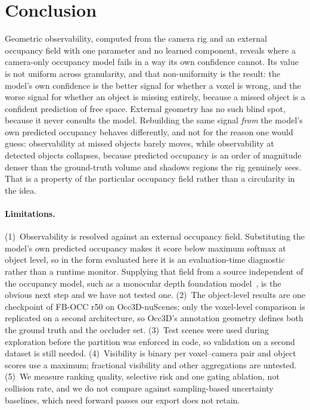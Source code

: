 \documentclass[10pt,twocolumn,letterpaper]{article}
\begin{document}
\section{Conclusion}
Geometric observability, computed from the camera rig and an external
occupancy field with one parameter and no learned component, reveals where
a camera-only occupancy model fails in a way its own confidence cannot.
Its value is not uniform across granularity, and that non-uniformity is the
result: the model's own confidence is the better signal for whether a voxel
is wrong, and the worse signal for whether an object is missing entirely,
because a missed object is a confident prediction of free space. External
geometry has no such blind spot, because it never consults the model.
Rebuilding the same signal \emph{from} the model's own predicted occupancy
behaves differently, and not for the reason one would guess: observability
at missed objects barely moves, while observability at detected objects
collapses, because predicted occupancy is an order of magnitude denser than
the ground-truth volume and shadows regions the rig genuinely sees. That is
a property of the particular occupancy field rather than a circularity in
the idea.

\paragraph{Limitations.}
(1)~Observability is resolved against an external occupancy field.
Substituting the model's own predicted occupancy makes it score below
maximum softmax at object level, so in the form evaluated here it is an
evaluation-time diagnostic rather than a runtime monitor. Supplying that
field from a source independent of the occupancy model, such as a monocular
depth foundation model~\cite{bochkovskii2024depthpro, hu2024metric3dv2}, is
the obvious next step and we have not tested one.
(2)~The object-level results are one checkpoint of FB-OCC r50 on
Occ3D-nuScenes; only the voxel-level comparison is replicated on a second
architecture, so Occ3D's annotation geometry defines both the ground truth
and the occluder set.
(3)~Test scenes were used during exploration before the partition was
enforced in code, so validation on a second dataset is still needed.
(4)~Visibility is binary per voxel--camera pair and object scores use a
maximum; fractional visibility and other aggregations are untested.
(5)~We measure ranking quality, selective risk and one gating ablation, not
collision rate, and we do not compare against sampling-based uncertainty
baselines, which need forward passes our export does not retain.
\end{document}
